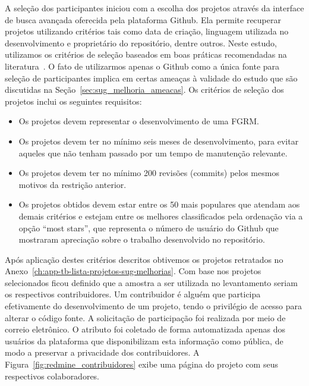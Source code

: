 A seleção dos participantes iniciou com a escolha dos projetos através da
interface de busca avançada oferecida pela plataforma Github. Ela permite
recuperar projetos utilizando critérios tais como data de criação, linguagem
utilizada no desenvolvimento e proprietário do repositório, dentre outros. Neste
estudo, utilizamos os critérios de seleção baseados em boas práticas
recomendadas na literatura~\cite{Bird2009}. O fato de utilizarmos apenas o
Github como a única fonte para seleção de participantes implica em certas
ameaças à validade do estudo que são discutidas na
Seção~\ref{sec:sug_melhoria_ameacas}. Os critérios de seleção dos projetos
inclui os seguintes requisitos:

\begin{itemize}
	\item Os projetos devem representar o desenvolvimento de uma FGRM\@.
    \item Os projetos devem ter no mínimo seis meses de desenvolvimento, para
        evitar aqueles que não tenham passado por um tempo de manutenção
        relevante.
	\item Os projetos devem  ter  no  mínimo  200  revisões (commits)  pelos
		mesmos motivos  da restrição anterior.
    \item Os projetos obtidos devem estar entre os 50 mais populares que atendam
        aos demais critérios e estejam entre os melhores classificados pela
        ordenação via a opção ``most stars'', que representa o número de usuário
        do Github que mostraram apreciação sobre o trabalho desenvolvido no
        repositório.
\end{itemize}

Após aplicação destes critérios descritos obtivemos os projetos retratados no
Anexo~\ref{ch:app-tb-lista-projetos-sug-melhorias}. Com base nos projetos
selecionados ficou definido que a amostra a ser utilizada no levantamento seriam
os respectivos contribuidores. Um contribuidor é alguém que participa
efetivamente do desenvolvimento de um projeto, tendo o privilégio de acesso para
alterar o código fonte. A solicitação de participação foi realizada por meio de
correio eletrônico. O atributo foi coletado de forma automatizada apenas dos
usuários da plataforma que disponibilizam esta informação como pública, de modo
a preservar a privacidade dos contribuidores. A
Figura~\ref{fig:redmine_contribuidores} exibe uma página do projeto com seus
respectivos colaboradores.

